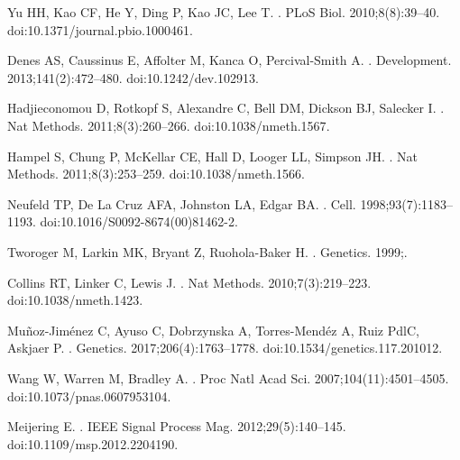 \documentclass[10pt,letterpaper]{article}
\begin{document}
\begin{thebibliography}{10}
Yu HH, Kao CF, He Y, Ding P, Kao JC, Lee T.
.
\newblock PLoS Biol. 2010;8(8):39--40.
\newblock doi:{10.1371/journal.pbio.1000461}.

Denes AS, Caussinus E, Affolter M, Kanca O, Percival-Smith A.
.
\newblock Development. 2013;141(2):472--480.
\newblock doi:{10.1242/dev.102913}.

Hadjieconomou D, Rotkopf S, Alexandre C, Bell DM, Dickson BJ, Salecker I.
.
\newblock Nat Methods. 2011;8(3):260--266.
\newblock doi:{10.1038/nmeth.1567}.

Hampel S, Chung P, McKellar CE, Hall D, Looger LL, Simpson JH.
.
\newblock Nat Methods. 2011;8(3):253--259.
\newblock doi:{10.1038/nmeth.1566}.

Neufeld TP, {De La Cruz} AFA, Johnston LA, Edgar BA.
.
\newblock Cell. 1998;93(7):1183--1193.
\newblock doi:{10.1016/S0092-8674(00)81462-2}.

Tworoger M, Larkin MK, Bryant Z, Ruohola-Baker H.
.
\newblock Genetics. 1999;.

Collins RT, Linker C, Lewis J.
.
\newblock Nat Methods. 2010;7(3):219--223.
\newblock doi:{10.1038/nmeth.1423}.

Mu{\~{n}}oz-Jim{\'{e}}nez C, Ayuso C, Dobrzynska A, Torres-Mend{\'{e}}z A, Ruiz
  PdlC, Askjaer P.
.
\newblock Genetics. 2017;206(4):1763--1778.
\newblock doi:{10.1534/genetics.117.201012}.

Wang W, Warren M, Bradley A.
.
\newblock Proc Natl Acad Sci. 2007;104(11):4501--4505.
\newblock doi:{10.1073/pnas.0607953104}.

Meijering E.
.
\newblock IEEE Signal Process Mag. 2012;29(5):140--145.
\newblock doi:{10.1109/msp.2012.2204190}.

\end{thebibliography}
\end{document}
